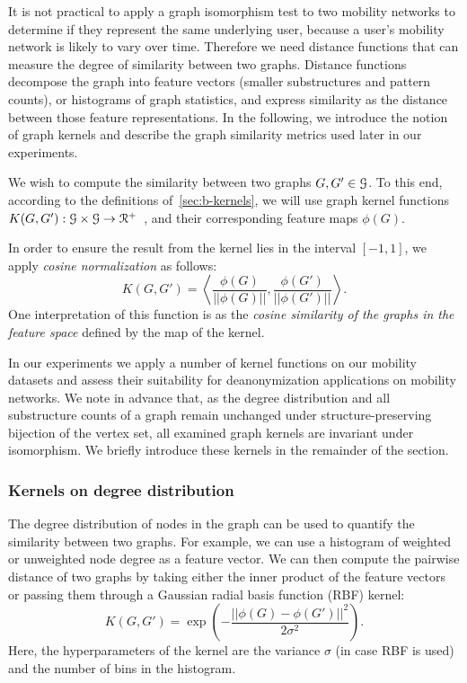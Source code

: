 It is not practical to apply a graph isomorphism test to two mobility networks to determine if they represent the same underlying user, because a user's mobility network is likely to vary over time.
Therefore we need distance functions that can measure the degree of similarity between two graphs.
Distance functions decompose the graph into feature vectors (smaller substructures and pattern counts), or histograms of graph statistics, and express similarity as the distance between those feature representations.
In the following, we introduce the notion of graph kernels and describe the graph similarity metrics used later in our experiments.

We wish to compute the similarity between two graphs $ G, G' \in \mathcal{G}$. 
To this end, according to the definitions of~\cref{sec:b-kernels}, we will use graph kernel functions $ K(G, G') : \mathcal{G} \times \mathcal{G} \rightarrow \mathcal{R}^{+}$~\citep{Vishwanathan2010}, and their corresponding feature maps $\phi(G)$.


In order to ensure the result from the kernel lies in the interval $[-1, 1]$, we apply \emph{cosine normalization} as follows:
\[
K({G}, {G}')=\left  \langle \frac{\phi({G})}{||\phi({G})||}, \frac{\phi(G')}{||\phi(G')||} \right  \rangle.
\]
One interpretation of this function is as the \emph{cosine similarity of the graphs in the feature space} defined by the map of the kernel.

In our experiments we apply a number of kernel functions on our mobility datasets and assess their suitability for deanonymization applications on mobility networks.
We note in advance that, as the degree distribution and all substructure counts of a graph remain unchanged under structure-preserving bijection of the vertex set, all examined graph kernels are invariant under isomorphism.
We briefly introduce these kernels in the remainder of the section.


\subsubsection{Kernels on degree distribution }

The degree distribution of nodes in the graph can be used to quantify the similarity between two graphs.
For example, we can use a histogram of weighted or unweighted node degree as a feature vector.
We can then compute the pairwise distance of two graphs by taking either the inner product of the feature vectors or passing them through a Gaussian radial basis function (RBF) kernel:
\[ K(G,G') =\exp\left( -\frac{||\phi(G) - \phi(G')||^2}{2\sigma^2} \right).\]
Here, the hyperparameters of the kernel are the variance $ \sigma $ (in case RBF is used) and the number of bins in the histogram.

